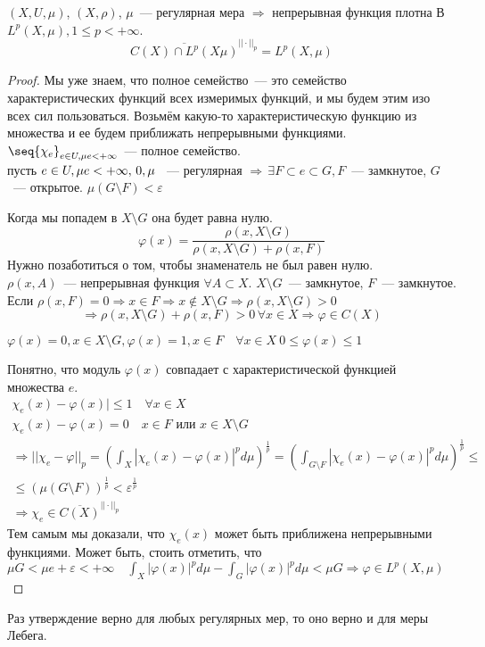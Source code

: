 \documentclass[document]{subfiles}
\begin{document}
\begin{theorem}
    $(X, U, \mu)$, $(X, \rho)$, $\mu$~--- регулярная мера $\Rightarrow$  непрерывная функция плотна В
    $L^p(X, \mu), 1 \leq p < + \infty$.
    \[ \overline{C(X) \cap L^p(X\mu)}^{|| \cdot ||_p} = L^p(X, \mu) \]
\end{theorem}
\begin{proof}
    Мы уже знаем, что полное семейство~--- это семейство характеристических функций всех
    измеримых функций, и мы будем этим изо всех сил пользоваться. Возьмём какую-то характеристическую функцию из множества и ее будем приближать
    непрерывными функциями. \\
    $\seq{ \chi_e}_{e \in U, \mu e < + \infty }$~--- полное семейство. \\
    пусть $ e \in U, \mu e < + \infty, \, \let \varepsilon > 0, \mu$ ~--- регулярная $\Rightarrow 
    \, \exists F \subset e \subset G, F$~--- замкнутое, $G$~--- открытое. $\mu(G \setminus F) < \varepsilon$
    
    Когда мы попадем в $X \setminus G$ она будет равна нулю.
    \[ \varphi(x) = \frac{\rho(x, X \setminus G)}{\rho(x, X \setminus G) + \rho(x, F)} \]
    Нужно позаботиться о том, чтобы знаменатель не был равен нулю. \\
    $\rho(x,A)$~--- непрерывная функция $\forall A \subset X$. $X \setminus G$~--- замкнутое, $F$~--- замкнутое.
    Если $\rho(x, F) = 0 \Rightarrow x \in F \Rightarrow x \notin X \setminus G \Rightarrow \rho(x, X \setminus G) > 0$ 
    \[ \Rightarrow \rho(x, X \setminus G) + \rho(x, F) > 0 \, \forall x \in X \Rightarrow \varphi \in C(X) \]

    $\varphi(x) = 0, x \in X \setminus G, \varphi(x) = 1, x \in F \quad \forall x \in X \: 0 \leq \varphi(x) \leq 1$

    Понятно, что модуль $\varphi(x)$ совпадает с характеристической функцией множества $e$.
    \begin{gather*}
        \chi_e(x) - \varphi(x)| \leq 1 \quad \forall x \in X \\
        \chi_e(x) - \varphi(x) = 0 \quad x \in F \text{ или } x \in X \setminus G \\
        \Rightarrow ||\chi_e - \varphi||_p = \left( \int_X |\chi_e(x) - \varphi(x) |^p d\mu \right)^{\frac{1}{p}} = 
        \left( \int_{G \setminus F} |\chi_e(x) - \varphi(x) |^p d \mu \right)^{\frac{1}{p}} \leq \\
        \leq \left( \mu(G \setminus F) \right)^{\frac{1}{p}} < \varepsilon^{\frac{1}{p}} \\
        \Rightarrow \chi_e \in \overline{C(X)}^{|| \cdot||_p}
    \end{gather*}
    Тем самым мы доказали, что $\chi_e(x)$ может быть приближена непрерывными функциями.
    Может быть, стоить отметить, что 
    $\mu G < \mu e + \varepsilon < +\infty \quad \int_X |\varphi(x)|^p d \mu - \int_G |\varphi(x)|^p d \mu < \mu G \Rightarrow
    \varphi \in L^p(X, \mu)$
    
\end{proof}


Раз утверждение верно для любых регулярных мер, то оно верно и для меры Лебега.
\end{document}
